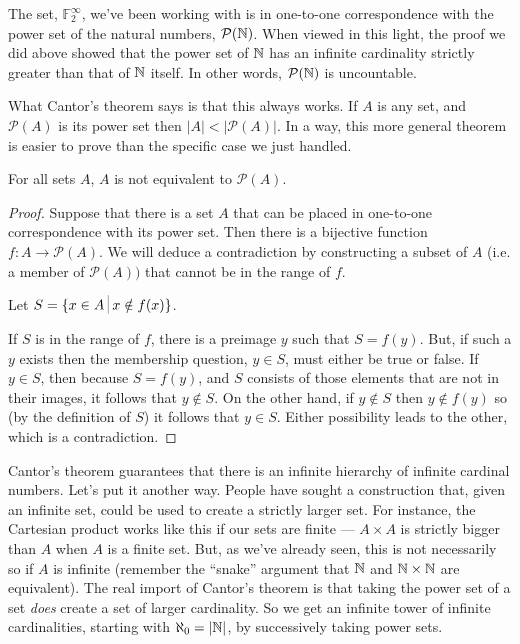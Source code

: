 The set, ${\mathbb F}_2^\infty$, we've been working with is in one-to-one correspondence
with the power set of the natural numbers, ${\mathcal P}({\mathbb N})$.  
When viewed in this light, the proof we did above showed that the power 
set of ${\mathbb N}$ has an infinite cardinality strictly greater than that 
of ${\mathbb N}$ itself.  In other words, ${\mathcal P}({\mathbb N})$ is
uncountable.

What Cantor's theorem says is that this always works. If $A$ is any set,
and ${\mathcal P}(A)$ is its power set then $|A| < |{\mathcal P}(A)|$. 
In a way, this more general
theorem is easier to prove than the specific case we just handled.

\begin{thm}[Cantor]  
For all sets $A$, $A$ is not equivalent to ${\mathcal P}(A)$.
\end{thm}

\begin{proof}
Suppose that there is a set $A$ that can be placed in one-to-one
correspondence with its power set.  Then there is a bijective
function $f : A \longrightarrow {\mathcal P}(A)$.  We will deduce 
a contradiction by constructing a subset of $A$ 
(i.e. a member of ${\mathcal P}(A))$ that cannot
be in the range of $f$.

Let $S = \{x \in A \suchthat x \notin f(x)\}$.

If $S$ is in the range of $f$, there is a preimage $y$ such that $S = f(y)$.
But, if such a $y$ exists then the membership question, $y \in S$, must
either be true or false.   If $y \in S$,  then because $S = f(y)$, and $S$
consists of those elements that are not in their images, it follows
that $y \notin S$.  On the other hand, if $y \notin S$ then $y \notin f(y)$ so 
(by the definition of $S$) it follows that $y \in S$.  Either possibility leads to the other, which is a contradiction.
\end{proof}

Cantor's theorem guarantees that there is an infinite hierarchy of infinite
cardinal numbers.  Let's put it another way.  People have sought a construction
that, given an infinite set, could be used to create a strictly larger set.  
For
instance, the Cartesian product works like this if our sets are finite --- 
$A \times A$ is strictly bigger than $A$ when $A$ is a finite set.  But, as 
we've already seen,
this is not necessarily so if $A$ is infinite (remember the ``snake'' argument
that ${\mathbb N}$ and ${\mathbb N} \times {\mathbb N}$ are equivalent).  The 
real import of Cantor's theorem is that taking the power set of a set 
\emph{does} create a set of larger cardinality.
So we get an infinite tower of infinite cardinalities, starting with 
$\aleph_0 = |{\mathbb N}|$, by successively taking power sets.

